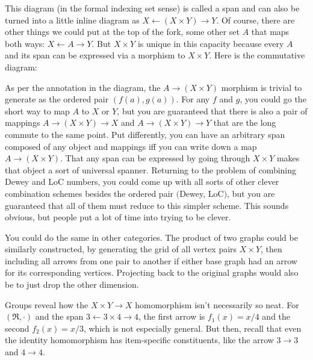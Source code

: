 \documentclass[11pt]{article}
\begin{document}

This diagram (in the formal indexing set sense) is called a span and can also be turned into a little inline diagram as
$X \leftarrow (X\times Y) \rightarrow Y$.
Of course, there are other things we could put at the top of the fork, some other
set $A$ that maps both ways: $X \leftarrow A \rightarrow Y$.
But $X\times Y$ is unique in this capacity because every $A$ and its span can be expressed
via a morphism to $X\times Y$. Here is the commutative diagram:


As per the annotation in the diagram, the $A\to (X\times Y)$ morphism is trivial to generate as
the ordered pair $(f(a), g(a))$.  For any $f$ and $g$, you could go the short way to
map $A$ to $X$ or $Y$, but you are guaranteed that there is also a pair of mappings
$A\to (X\times Y) \to X$ and $A\to (X\times Y) \to Y$ that are the long commute to the
same point.  Put differently, you can have an arbitrary span composed of any object and
mappings iff you can write down a map $A\to (X\times Y)$. That any span can be expressed
by going through $X\times Y$ makes that object a sort of universal spanner. Returning
to the problem of combining Dewey and LoC numbers, you could come up with all sorts
of other clever combination schemes besides the ordered pair $($Dewey, LoC$)$, but
you are guaranteed that all of them must reduce to this simpler scheme. This sounds
obvious, but people put a lot of time into trying to be clever.

You could do the same in other categories. The product of two graphs could be similarly
constructed, by generating the grid of all vertex pairs $X\times Y$, then including all
arrows from one pair to another if either base graph had an arrow for its corresponding
vertices. Projecting back to the original graphs would also be to just drop the other
dimension.

Groups reveal how the $X\times Y \to X$ homomorphism isn't
necessarily so neat. For $(\Re, \cdot)$ and the span $3 \leftarrow 3\times 4 \rightarrow 4$, the
first arrow is $f_1(x)=x/4$ and the second $f_2(x)=x/3$, which is not especially general.
But then, recall that even the identity homomorphism has item-specific constituents, like the arrow $3\to 3$ and $4\to
4$.
\end{document}
